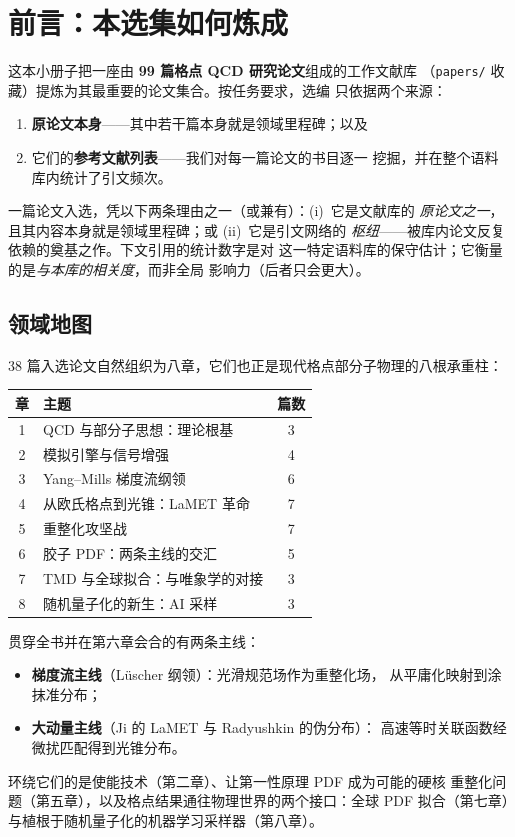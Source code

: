 \chapter*{前言：本选集如何炼成}

这本小册子把一座由 \textbf{99 篇格点 QCD 研究论文}组成的工作文献库
（\texttt{papers/} 收藏）提炼为其最重要的论文集合。按任务要求，选编
只依据两个来源：

\begin{enumerate}
  \item \textbf{原论文本身}——其中若干篇本身就是领域里程碑；以及
  \item 它们的\textbf{参考文献列表}——我们对每一篇论文的书目逐一
        挖掘，并在整个语料库内统计了引文频次。
\end{enumerate}

一篇论文入选，凭以下两条理由之一（或兼有）：(i)~它是文献库的
\emph{原论文之一}，且其内容本身就是领域里程碑；或 (ii)~它是引文网络的
\emph{枢纽}——被库内论文反复依赖的奠基之作。下文引用的统计数字是对
这一特定语料库的保守估计；它衡量的是\emph{与本库的相关度}，而非全局
影响力（后者只会更大）。

\section*{领域地图}

38 篇入选论文自然组织为八章，它们也正是现代格点部分子物理的八根承重柱：

\begin{center}
\begin{tabular}{clc}
\toprule
章 & 主题 & 篇数\\
\midrule
1 & QCD 与部分子思想：理论根基 & 3\\
2 & 模拟引擎与信号增强 & 4\\
3 & Yang--Mills 梯度流纲领 & 6\\
4 & 从欧氏格点到光锥：LaMET 革命 & 7\\
5 & 重整化攻坚战 & 7\\
6 & 胶子 PDF：两条主线的交汇 & 5\\
7 & TMD 与全球拟合：与唯象学的对接 & 3\\
8 & 随机量子化的新生：AI 采样 & 3\\
\bottomrule
\end{tabular}
\end{center}

贯穿全书并在第六章会合的有两条主线：
\begin{itemize}
  \item \textbf{梯度流主线}（L\"uscher 纲领）：光滑规范场作为重整化场，
        从平庸化映射到涂抹准分布；
  \item \textbf{大动量主线}（Ji 的 LaMET 与 Radyushkin 的伪分布）：
        高速等时关联函数经微扰匹配得到光锥分布。
\end{itemize}
环绕它们的是使能技术（第二章）、让第一性原理 PDF 成为可能的硬核
重整化问题（第五章），以及格点结果通往物理世界的两个接口：全球 PDF
拟合（第七章）与植根于随机量子化的机器学习采样器（第八章）。

